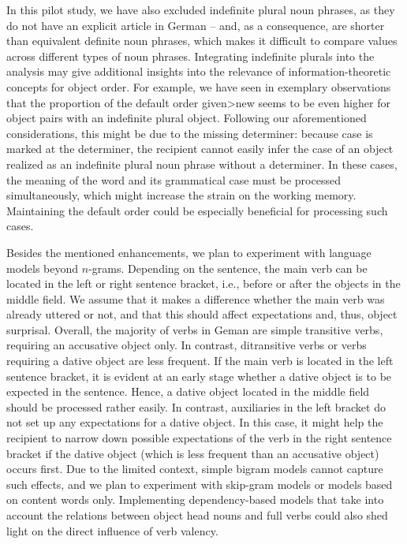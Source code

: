 \documentclass[output=paper,colorlinks,citecolor=brown]{langscibook}
\begin{document}
In this pilot study, we have also excluded indefinite plural noun phrases, as they do not have an explicit article in German -- and, as a consequence, are shorter than equivalent definite noun phrases, which makes it difficult to compare \DDIFF values across different types of noun phrases. Integrating indefinite plurals into the analysis may give additional insights into the relevance of information-theoretic concepts for object order. For example, we have seen in exemplary observations that the proportion of the default order given>new seems to be even higher for object pairs with an indefinite plural object. Following our aforementioned considerations, this might be due to the missing determiner: because case is marked at the determiner,  the recipient cannot easily infer the case of an object realized as an indefinite plural noun phrase without a determiner. In these cases, the meaning of the word and its grammatical case must be processed simultaneously, which might increase the strain on the working memory. Maintaining the default order could be especially beneficial for processing such cases.

Besides the mentioned enhancements, we plan to experiment with language models beyond $n$-grams. Depending on the sentence, the main verb can be located in the left or right sentence bracket, i.e., before or after the objects in the middle field. We assume that it makes a difference whether the main verb was already uttered or not, and that this should affect expectations and, thus, object surprisal. Overall, the majority of verbs in Geman are simple transitive verbs, requiring an accusative object only. In contrast, ditransitive verbs or verbs requiring a dative object are less frequent. If the main verb is located in the left sentence bracket, it is evident at an early stage whether a dative object is to be expected in the sentence. Hence, a dative object located in the middle field should be processed rather easily. In contrast, auxiliaries in the left bracket do not set up any expectations for a dative object. In this case, it might help the recipient to narrow down possible expectations of the verb in the right sentence bracket if the dative object (which is less frequent than an accusative object) occurs first. Due to the limited context, simple bigram models cannot capture such effects, and we plan to experiment with skip-gram models or models based on content words only. Implementing dependency-based models that take into account the relations between object head nouns and full verbs could also shed light on the direct influence of verb valency.
\end{document}
